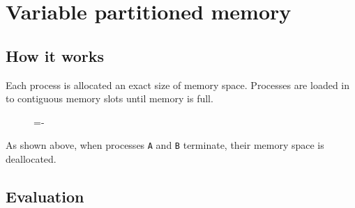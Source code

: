 \documentclass[a4paper]{systems-software}
\begin{document}
\section*{Variable partitioned memory}

\subsection*{How it works}

Each process is allocated an exact size of memory space. Processes are loaded in to contiguous memory slots until memory is full.

\begin{figure}[H]
  \lineskip=-\fboxrule
\end{figure}

As shown above, when processes \texttt{A} and \texttt{B} terminate, their memory space is deallocated.


\subsection*{Evaluation}
\end{document}
